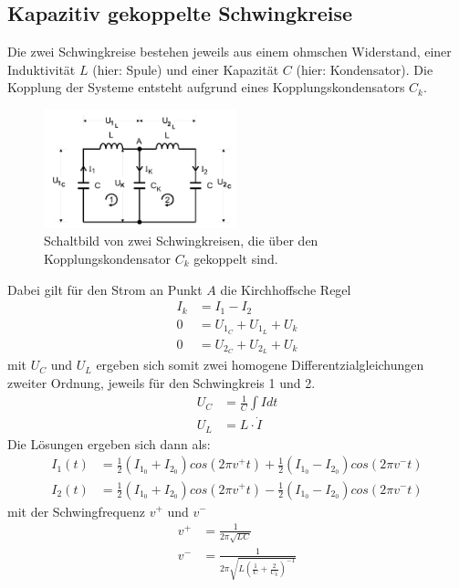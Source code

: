 \subsection{Kapazitiv gekoppelte Schwingkreise}
Die zwei Schwingkreise bestehen jeweils aus einem ohmschen Widerstand, einer Induktivität $L$
(hier: Spule) und einer Kapazität $C$ (hier: Kondensator). Die Kopplung der Systeme 
entsteht aufgrund eines Kopplungskondensators $C_k$.\\
\begin{figure}[H]
    \centering
    \includegraphics[width=0.5\textwidth]{bilder/schwingkreis_allgemein.jpg}
    \caption{Schaltbild von zwei Schwingkreisen, die über den Kopplungskondensator $C_k$ gekoppelt sind. \cite[299]{Anleitung}}
\end{figure} 
Dabei gilt für den Strom an Punkt $A$ die Kirchhoffsche Regel
\begin{align}
    I_k&=I_1-I_2 \\
    0&=U_{1_C}+U_{1_L}+U_k\\
    0&=U_{2_C}+U_{2_L}+U_k
\end{align}
mit $U_C$ und $U_L$ ergeben sich somit zwei homogene Differentzialgleichungen zweiter Ordnung, 
jeweils für den Schwingkreis 1 und 2. 
\begin{align}
    U_C&=\frac{1}{C}\int{I dt}\\
    U_L&=L \cdot \dot{I}
\end{align}
Die Lösungen ergeben sich dann als:
\begin{align}
    I_1(t)&=\frac{1}{2} \left( I_{1_0}+I_{2_0}\right)cos\left(2 \pi v^+ t\right)+\frac{1}{2}\left(I_{1_0}-I_{2_0}\right)cos\left(2 \pi v^- t\right)\\
    I_2(t)&=\frac{1}{2}\left(I_{1_0}+I_{2_0}\right)cos\left(2 \pi v^+ t\right)-\frac{1}{2}\left(I_{1_0}-I_{2_0}\right)cos\left(2 \pi v^- t\right)
\end{align}
mit der Schwingfrequenz $v^+$ und $v^-$ 
\begin{align}
    v^+&=\frac{1}{2\pi\sqrt{LC}}
    \label{eqn:Fundamental_Frequenzen1}\\
    v^-&=\frac{1}{2 \pi \sqrt{L\left(\frac{1}{C}+\frac{2}{C_k}\right)^{-1}}}
    \label{eqn:Fundamental_Frequenzen2}
\end{align}
